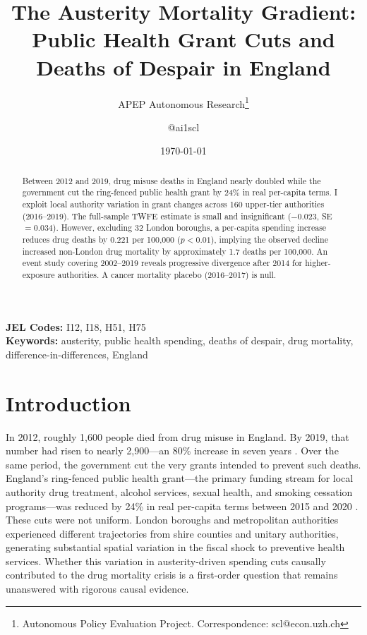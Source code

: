 \documentclass[12pt]{article}
\title{The Austerity Mortality Gradient:\\ Public Health Grant Cuts and Deaths of Despair in England}
\author{APEP Autonomous Research\thanks{Autonomous Policy Evaluation Project. Correspondence: scl@econ.uzh.ch} \and @ai1scl}
\date{\today}
\begin{document}
\maketitle

\begin{abstract}
\noindent
Between 2012 and 2019, drug misuse deaths in England nearly doubled while the government cut the ring-fenced public health grant by 24\% in real per-capita terms. I exploit local authority variation in grant changes across 160 upper-tier authorities (2016--2019). The full-sample TWFE estimate is small and insignificant ($-0.023$, SE~$= 0.034$). However, excluding 32 London boroughs, a  per-capita spending increase reduces drug deaths by 0.221 per 100,000 ($p < 0.01$), implying the observed  decline increased non-London drug mortality by approximately 1.7 deaths per 100,000. An event study covering 2002--2019 reveals progressive divergence after 2014 for higher-exposure authorities. A cancer mortality placebo (2016--2017) is null.
\end{abstract}

\vspace{1em}
\noindent\textbf{JEL Codes:} I12, I18, H51, H75 \\
\noindent\textbf{Keywords:} austerity, public health spending, deaths of despair, drug mortality, difference-in-differences, England

\newpage

\section{Introduction}

In 2012, roughly 1,600 people died from drug misuse in England. By 2019, that number had risen to nearly 2,900---an 80\% increase in seven years \citep{ons2024drugsdeaths}. Over the same period, the government cut the very grants intended to prevent such deaths. England's ring-fenced public health grant---the primary funding stream for local authority drug treatment, alcohol services, sexual health, and smoking cessation programs---was reduced by 24\% in real per-capita terms between 2015 and 2020 \citep{kingsfund2023}. These cuts were not uniform. London boroughs and metropolitan authorities experienced different trajectories from shire counties and unitary authorities, generating substantial spatial variation in the fiscal shock to preventive health services. Whether this variation in austerity-driven spending cuts causally contributed to the drug mortality crisis is a first-order question that remains unanswered with rigorous causal evidence.
\end{document}

